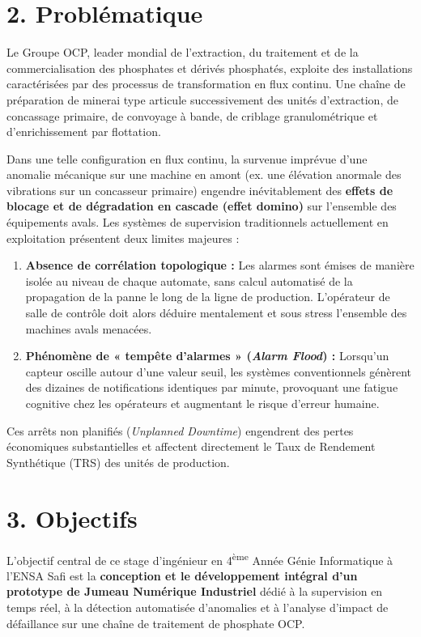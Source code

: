 \section*{2. Problématique}
Le Groupe OCP, leader mondial de l'extraction, du traitement et de la commercialisation des phosphates et dérivés phosphatés, exploite des installations caractérisées par des processus de transformation en flux continu. Une chaîne de préparation de minerai type articule successivement des unités d'extraction, de concassage primaire, de convoyage à bande, de criblage granulométrique et d'enrichissement par flottation.

Dans une telle configuration en flux continu, la survenue imprévue d'une anomalie mécanique sur une machine en amont (ex. une élévation anormale des vibrations sur un concasseur primaire) engendre inévitablement des \textbf{effets de blocage et de dégradation en cascade (effet domino)} sur l'ensemble des équipements avals. Les systèmes de supervision traditionnels actuellement en exploitation présentent deux limites majeures :
\begin{enumerate}
    \item \textbf{Absence de corrélation topologique :} Les alarmes sont émises de manière isolée au niveau de chaque automate, sans calcul automatisé de la propagation de la panne le long de la ligne de production. L'opérateur de salle de contrôle doit alors déduire mentalement et sous stress l'ensemble des machines avals menacées.
    \item \textbf{Phénomène de « tempête d'alarmes » (\textit{Alarm Flood}) :} Lorsqu'un capteur oscille autour d'une valeur seuil, les systèmes conventionnels génèrent des dizaines de notifications identiques par minute, provoquant une fatigue cognitive chez les opérateurs et augmentant le risque d'erreur humaine.
\end{enumerate}

Ces arrêts non planifiés (\textit{Unplanned Downtime}) engendrent des pertes économiques substantielles et affectent directement le Taux de Rendement Synthétique (TRS) des unités de production.

\section*{3. Objectifs}
L'objectif central de ce stage d'ingénieur en 4\textsuperscript{ème} Année Génie Informatique à l'ENSA Safi est la \textbf{conception et le développement intégral d'un prototype de Jumeau Numérique Industriel} dédié à la supervision en temps réel, à la détection automatisée d'anomalies et à l'analyse d'impact de défaillance sur une chaîne de traitement de phosphate OCP.

